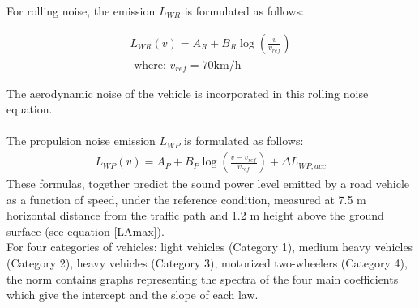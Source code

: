 \documentclass{article}
\begin{document}
\noindent For rolling noise, the emission $L_{WR}$ is formulated as follows:



\begin{equation}
    \label{RNC_IMAGINE}
    \begin{aligned}
        L_{WR}(v) = A_R+B_R\log(\frac{v}{v_{ref}}) \\
        \text{ where: } v_{ref}=70 \text{km/h}
    \end{aligned}
\end{equation}

\noindent The aerodynamic noise of the vehicle is incorporated in this rolling noise equation.\\
\\

\noindent The propulsion noise emission $L_{WP}$ is formulated as follows:
\begin{equation}
    \label{RNC_IMAGINE}
    \begin{aligned}
        L_{WP}(v) = A_P+B_P\log(\frac{v-v_{ref}}{v_{ref}})+ \Delta L_{WP,acc} 
        
    \end{aligned}
\end{equation}
\noindent These formulas, together predict the sound power level emitted by a road vehicle as a function of speed, under the reference condition, measured at 7.5 m horizontal distance from the traffic path and 1.2 m height above the ground surface (see equation \ref{LAmax}).\\

\noindent For four categories of vehicles: light vehicles (Category 1), medium heavy vehicles (Category 2), heavy vehicles (Category 3), motorized two-wheelers (Category 4), the norm contains graphs representing the spectra of the four main coefficients which give the intercept and the slope of each law.

\newpage
\end{document}
